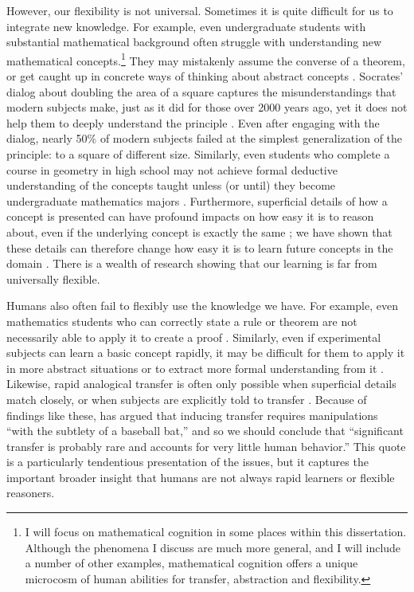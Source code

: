 However, our flexibility is not universal. Sometimes it is quite difficult for us to integrate new knowledge. For example, even undergraduate students with substantial mathematical background often struggle with understanding new mathematical concepts.\footnote{I will focus on mathematical cognition in some places within this dissertation. Although the phenomena I discuss are much more general, and I will include a number of other examples, mathematical cognition offers a unique microcosm of human abilities for transfer, abstraction and flexibility.} They may mistakenly assume the converse of a theorem, or get caught up in concrete ways of thinking about abstract concepts \citep{Hazzan1999}. Socrates' dialog about doubling the area of a square captures the misunderstandings that modern subjects make, just as it did for those over 2000 years ago, yet it does not help them to deeply understand the principle \citep{Goldin2011}. Even after engaging with the dialog, nearly 50\% of modern subjects failed at the simplest generalization of the principle: to a square of different size. Similarly, even students who complete a course in geometry in high school may not achieve formal deductive understanding of the concepts taught unless (or until) they become undergraduate mathematics majors \citep{Burger1986}. Furthermore, superficial details of how a concept is presented can have profound impacts on how easy it is to reason about, even if the underlying concept is exactly the same \citep[e.g.][]{Kotovsky1985, Kaminski2008}; we have shown that these details can therefore change how easy it is to learn future concepts in the domain \citep{Lampinen2017b}. There is a wealth of research showing that our learning is far from universally flexible. \par 
Humans also often fail to flexibly use the knowledge we have. For example, even mathematics students who can correctly state a rule or theorem are not necessarily able to apply it to create a proof \citep{Weber2001}. Similarly, even if experimental subjects can learn a basic concept rapidly, it may be difficult for them to apply it in more abstract situations or to extract more formal understanding from it \citep[e.g.][]{Lampinen2017b}. Likewise, rapid analogical transfer is often only possible when superficial details match closely, or when subjects are explicitly told to transfer \citep[e.g.][]{Gick1980}. Because of findings like these, \citet{Detterman1993} has argued that inducing transfer requires manipulations ``with the subtlety of a baseball bat,'' and so we should conclude that ``significant transfer is probably rare and accounts for very little human behavior.'' This quote is a particularly tendentious presentation of the issues, but it captures the important broader insight that humans are not always rapid learners or flexible reasoners. \par 
